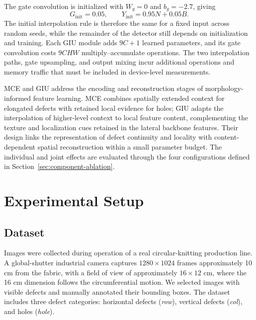 \documentclass[journal]{IEEEtran}
\begin{document}
The gate convolution is initialized with $W_g=0$ and $b_g=-2.7$, giving
\begin{equation}
G_{\mathrm{init}}=0.05,\qquad
Y_{\mathrm{init}}=0.95N+0.05B.
\label{eq:giu-initialization}
\end{equation}
The initial interpolation rule is therefore the same for a fixed input across random seeds, while the remainder of the detector still depends on initialization and training. Each GIU module adds $9C+1$ learned parameters, and its gate convolution costs $9CHW$ multiply--accumulate operations. The two interpolation paths, gate upsampling, and output mixing incur additional operations and memory traffic that must be included in device-level measurements.

MCE and GIU address the encoding and reconstruction stages of morphology-informed feature learning. MCE combines spatially extended context for elongated defects with retained local evidence for holes; GIU adapts the interpolation of higher-level context to local feature content, complementing the texture and localization cues retained in the lateral backbone features. Their design links the representation of defect continuity and locality with content-dependent spatial reconstruction within a small parameter budget. The individual and joint effects are evaluated through the four configurations defined in Section~\ref{sec:component-ablation}.

\section{Experimental Setup}
\subsection{Dataset}
Images were collected during operation of a real circular-knitting production line. A global-shutter industrial camera captures $1280\times1024$ frames approximately 10 cm from the fabric, with a field of view of approximately $16\times12$ cm, where the 16 cm dimension follows the circumferential motion. We selected images with visible defects and manually annotated their bounding boxes. The dataset includes three defect categories: horizontal defects (\emph{row}), vertical defects (\emph{col}), and holes (\emph{hole}).
\end{document}
